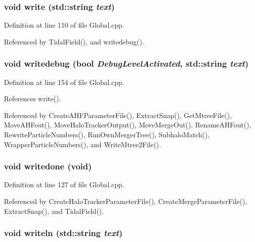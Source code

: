 \subsubsection[{write}]{\setlength{\rightskip}{0pt plus 5cm}void write (std::string {\em text})}\label{Global_8cpp_aadd6ff8eac457116cc843c4b98bc0636}


Definition at line 110 of file Global.cpp.



Referenced by TidalField(), and writedebug().

\subsubsection[{writedebug}]{\setlength{\rightskip}{0pt plus 5cm}void writedebug (bool {\em DebugLevelActivated}, \/  std::string {\em text})}\label{Global_8cpp_a865c3c98145e9535ae7575ff0161119d}


Definition at line 154 of file Global.cpp.



References write().



Referenced by CreateAHFParameterFile(), ExtractSnap(), GetMtreeFile(), MoveAHFout(), MoveHaloTrackerOutput(), MoveMergeOut(), RenameAHFout(), RewriteParticleNumbers(), RunOwnMergerTree(), SubhaloMatch(), WrapperParticleNumbers(), and WriteMtree2File().

\subsubsection[{writedone}]{\setlength{\rightskip}{0pt plus 5cm}void writedone (void)}\label{Global_8cpp_a90a26977d0e79592478299043e94091e}


Definition at line 127 of file Global.cpp.



Referenced by CreateHaloTrackerParameterFile(), CreateMergeParameterFile(), ExtractSnap(), and TidalField().

\subsubsection[{writeln}]{\setlength{\rightskip}{0pt plus 5cm}void writeln (std::string {\em text})}\label{Global_8cpp_a37de7b6ae4852c4084f30507d58eb906}


